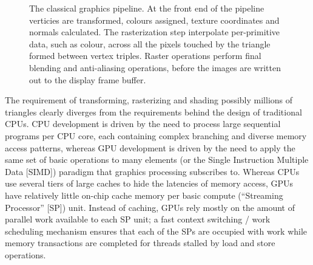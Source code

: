 \begin{figure}[ht!]
 \begin{mdframed}
 \centering
 \caption[Graphics pipeline]{The classical graphics pipeline. At the front end of the pipeline verticies are transformed, colours assigned,
 texture coordinates and normals calculated. The rasterization step interpolate per-primitive data, such as colour, across all the pixels 
 touched by the triangle formed between vertex triples. Raster operations perform final blending and anti-aliasing operations, before the images are written
 out to the display frame buffer.}
 \label{fig_graphics_pipeline}
 \end{mdframed}
\end{figure}

The requirement of transforming, rasterizing and shading possibly millions of triangles clearly diverges from the requirements behind the
design of traditional CPUs. CPU development is driven by the need to process large sequential programs per CPU core, each containing complex branching and diverse memory access patterns, 
whereas GPU development is driven by the need to apply the same set of basic operations to many elements (or the Single Instruction Multiple Data [SIMD]) paradigm that graphics processing subscribes to. 
Whereas CPUs use several tiers of large caches to hide the latencies of memory access, GPUs have relatively little on-chip cache memory per basic compute (``Streaming Processor'' [SP]) 
unit. Instead of caching, GPUs rely mostly on the amount of parallel work available to each SP unit; a fast context switching / work scheduling mechanism ensures that each of the 
SPs are occupied with work while memory transactions are completed for threads stalled by load and store operations.


